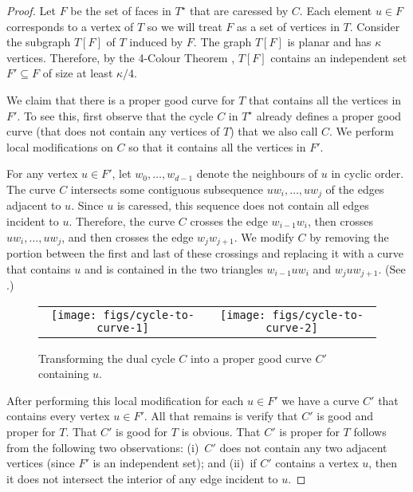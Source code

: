 \documentclass{patmorin}
\newcommand{\dual}[1]{{#1}^\star}
\begin{document}
\begin{proof}
  Let $F$ be the set of faces in $\dual{T}$ that are caressed by $C$. Each
  element $u\in F$ corresponds to a vertex of $T$ so we will treat $F$ as
  a set of vertices in $T$.  Consider the subgraph $T[F]$ of $T$ induced
  by $F$.  The graph $T[F]$ is planar and has $\kappa$ vertices. Therefore,
  by the 4-Colour Theorem \cite{robertson.seymour.ea:four-colour}, $T[F]$
  contains an independent set $F'\subseteq F$ of size at least $\kappa/4$.

  We claim that there is a proper good curve for $T$ that contains all
  the vertices in $F'$.  To see this, first observe that the cycle $C$ in
  $\dual{T}$ already defines a proper good curve (that does not contain
  any vertices of $T$) that we also call $C$.  We perform
  local modifications on $C$ so that it contains all the vertices in $F'$.

  For any vertex $u\in F'$, let $w_0,\ldots,w_{d-1}$ denote the neighbours
  of $u$ in cyclic order.  The curve $C$ intersects some contiguous
  subsequence $uw_i,\ldots,uw_j$ of the edges adjacent to $u$.  Since $u$
  is caressed, this sequence does not contain all edges incident
  to $u$. Therefore, the curve $C$ crosses the edge $w_{i-1}w_i$, then
  crosses $uw_i,\ldots,uw_j$, and then crosses the edge $w_j w_{j+1}$.
  We modify $C$ by removing the portion between the first and last of
  these crossings and replacing it with a curve that contains $u$ and is
  contained in the two triangles $w_{i-1}uw_i$ and $w_juw_{j+1}$. (See
  .)

  \begin{figure}
     \begin{center}
	\begin{tabular}{cc}
		\texttt{[image: figs/cycle-to-curve-1]} &
		\texttt{[image: figs/cycle-to-curve-2]}
	\end{tabular}
     \end{center}
     \caption{Transforming the dual cycle $C$ into a proper good curve $C'$ containing $u$.}
  \end{figure}

  After performing this local modification for each $u\in F'$ we have
  a curve $C'$ that contains every vertex $u\in F'$.  All that remains
  is verify that $C'$ is good and proper for $T$. That $C'$ is good for
  $T$ is obvious.  That $C'$ is proper for $T$ follows from the following two
  observations: (i)~$C'$ does not contain any two adjacent vertices (since
  $F'$ is an independent set); and (ii)~if $C'$ contains a vertex $u$,
  then it does not intersect the interior of any edge incident to $u$.
\end{proof}
\end{document}
